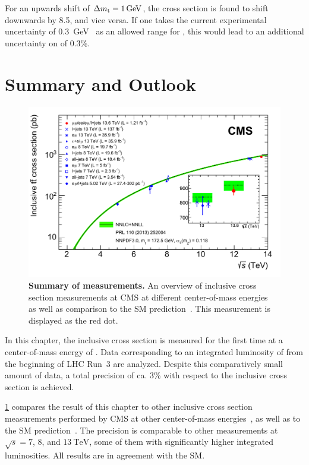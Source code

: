 For an upwards shift of $\Delta \mt = \SI{1}{\GeV}$, the \ttbar cross section is found to shift downwards by \SI{8.5}{\pb}, and vice versa. If one takes the current experimental uncertainty of \SI{0.3}{\GeV}~\cite{PDG:2022pth} as an allowed range for \mt, this would lead to an additional uncertainty on \sigmatt of 0.3\%.

\section{Summary and Outlook}

\begin{figure}[!ht]
    \centering
    \includegraphics[width=0.8\linewidth]{figures/ttxs/tt_curve.pdf}
    \caption{\textbf{Summary of \sigmatt measurements.} An overview of inclusive \ttbar cross section measurements at CMS at different center-of-mass energies~\cite{CMS:TOP-11-007, CMS:TOP-14-018, CMS:TOP-12-006, CMS:TOP-13-004, CMS:TOP-17-001, CMS:TOP-18-005, CMS:TOP-20-001, CMS:TOP-20-004} as well as comparison to the SM prediction~\cite{Czakon:2013goa}. This measurement is displayed as the red dot.}
    \label{fig:ttxs:ttcurve}
\end{figure}

In this chapter, the inclusive \ttbar cross section is measured for the first time at a center-of-mass energy of \sqrtsRIII. Data corresponding to an integrated luminosity of \lumiRIII from the beginning of LHC Run~3 are analyzed. Despite this comparatively small amount of data, a total precision of ca. 3\% with respect to the inclusive cross section is achieved.

\cref{fig:ttxs:ttcurve} compares the result of this chapter to other inclusive \ttbar cross section measurements performed by CMS at other center-of-mass energies~\cite{CMS:TOP-11-007, CMS:TOP-14-018, CMS:TOP-12-006, CMS:TOP-13-004, CMS:TOP-17-001, CMS:TOP-18-005, CMS:TOP-20-001, CMS:TOP-20-004}, as well as to the SM prediction~\cite{Czakon:2013goa}. The precision is comparable to other measurements at $\sqrt{s} = 7$, $8$, and $\SI{13}{\TeV}$, some of them with significantly higher integrated luminosities. All results are in agreement with the SM.

